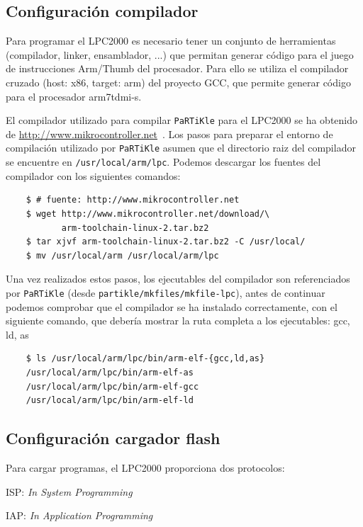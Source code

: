 \documentclass[10pt,a4paper]{article}
\newcommand{\partikle}[0]{\texttt{PaRTiKle}}
\newcommand{\hrefx}[1]{\href{#1}{#1}} %
\newenvironment{itemize*}
        {\begin{itemize}%
                \setlength{\parskip}{2pt}%
                \setlength{\itemsep}{0pt}}
        {\end{itemize}}
\begin{document}
	\subsection{Configuración compilador}
	
	Para programar el LPC2000 es necesario tener un conjunto de herramientas (compilador, linker, ensamblador, ...) que permitan generar código para el juego de instrucciones Arm/Thumb del procesador. Para ello se utiliza el compilador cruzado (host: x86, target: arm) del proyecto GCC, que permite generar código para el procesador arm7tdmi-s.
	
	El compilador utilizado para compilar \partikle{} para el LPC2000 se ha obtenido de \hrefx{http://www.mikrocontroller.net}~\cite{mikro}. Los pasos para preparar el entorno de compilación utilizado por \partikle{} asumen que el directorio raiz del compilador se encuentre en \texttt{/usr/local/arm/lpc}. Podemos descargar los fuentes del compilador con los siguientes comandos:
	
	\begin{verbatim}
	$ # fuente: http://www.mikrocontroller.net
	$ wget http://www.mikrocontroller.net/download/\
	       arm-toolchain-linux-2.tar.bz2
	$ tar xjvf arm-toolchain-linux-2.tar.bz2 -C /usr/local/
	$ mv /usr/local/arm /usr/local/arm/lpc
	\end{verbatim}
	
	Una vez realizados estos pasos, los ejecutables del compilador son referenciados por \partikle{} (desde \texttt{partikle/\-mkfiles/\-mkfile-lpc}), antes de continuar podemos comprobar que el compilador se ha instalado correctamente, con el siguiente comando, que debería mostrar la ruta completa a los ejecutables: gcc, ld, as
	
	\begin{verbatim}
	$ ls /usr/local/arm/lpc/bin/arm-elf-{gcc,ld,as}
	/usr/local/arm/lpc/bin/arm-elf-as
	/usr/local/arm/lpc/bin/arm-elf-gcc
	/usr/local/arm/lpc/bin/arm-elf-ld
	\end{verbatim}
	
	\subsection{Configuración cargador flash}

	Para cargar programas, el LPC2000 proporciona dos protocolos:

	\begin{itemize*}
	\item ISP: \emph{In System Programming}
	\item IAP: \emph{In Application Programming}
	\end{itemize*}
	
\end{document}
